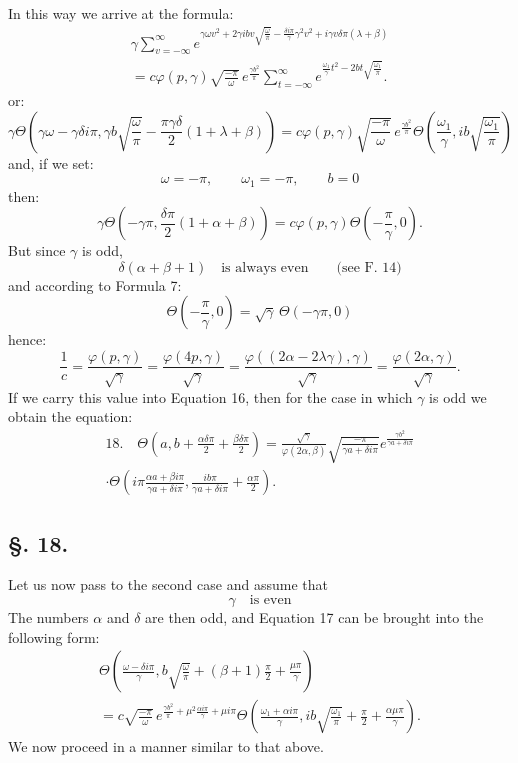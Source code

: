 \documentclass[10pt]{article}
\newcommand{\sourceanchor}[1]{\hypertarget{source-#1}{}}
\begin{document}
In this way we arrive at the formula:
\begin{multline*}
\gamma\sum_{v=-\infty}^{\infty}
 e^{\gamma\omega v^{2}+2\gamma ibv\sqrt{\frac{\omega}{\pi}}-\frac{\delta i\pi}{\gamma}\gamma^{2}v^{2}+i\gamma v\delta\pi(\lambda+\beta)}\\
=c\varphi(p,\gamma)\sqrt{\frac{-\pi}{\omega}}\,e^{\frac{\gamma b^{2}}{\pi}}
\sum_{t=-\infty}^{\infty}e^{\frac{\omega_{1}}{\gamma}t^{2}-2bt\sqrt{\frac{\omega_{1}}{\pi}}}.
\end{multline*}
or:
\begin{equation*}
\gamma\Theta\!\left(\gamma\omega-\gamma\delta i\pi,
 \gamma b\sqrt{\frac{\omega}{\pi}}-\frac{\pi\gamma\delta}{2}(1+\lambda+\beta)\right)
=c\varphi(p,\gamma)\sqrt{\frac{-\pi}{\omega}}\,e^{\frac{\gamma b^{2}}{\pi}}
\Theta\!\left(\frac{\omega_{1}}{\gamma},ib\sqrt{\frac{\omega_{1}}{\pi}}\right)
\end{equation*}
and, if we set:
\[
\omega=-\pi,
\qquad \omega_{1}=-\pi,
\qquad b=0
\]
then:
\[
\gamma\Theta\!\left(-\gamma\pi,\frac{\delta\pi}{2}(1+\alpha+\beta)\right)
=c\varphi(p,\gamma)\Theta\!\left(-\frac{\pi}{\gamma},0\right).
\]
But since \(\gamma\) is odd,
\[
\delta(\alpha+\beta+1)\quad\text{is always even} \qquad\text{(see F. 14)}
\]
and according to Formula 7:
\[
\Theta\!\left(-\frac{\pi}{\gamma},0\right)=\sqrt{\gamma}\,\Theta(-\gamma\pi,0)
\]
hence:
\[
\frac{1}{c}=\frac{\varphi(p,\gamma)}{\sqrt{\gamma}}
=\frac{\varphi(4p,\gamma)}{\sqrt{\gamma}}
=\frac{\varphi((2\alpha-2\lambda\gamma),\gamma)}{\sqrt{\gamma}}
=\frac{\varphi(2\alpha,\gamma)}{\sqrt{\gamma}}.
\]
If we carry this value into Equation 16, then for the case in which \(\gamma\) is odd we obtain the equation:
\begin{multline*}
18.\quad
\Theta\!\left(a,b+\frac{\alpha\delta\pi}{2}+\frac{\beta\delta\pi}{2}\right)
=\frac{\sqrt{\gamma}}{\varphi(2\alpha,\beta)}
\sqrt{\frac{-\pi}{\gamma a+\delta i\pi}}
 e^{\frac{\gamma b^{2}}{\gamma a+\delta i\pi}}\\
\cdot\Theta\!\left(i\pi\frac{\alpha a+\beta i\pi}{\gamma a+\delta i\pi},
\frac{ib\pi}{\gamma a+\delta i\pi}+\frac{\alpha\pi}{2}\right).
\end{multline*}

\subsection*{\S. 18.}
Let us now pass to the second case and assume that
\[
\gamma\quad\text{is even}
\]
\sourceanchor{PA15}
The numbers \(\alpha\) and \(\delta\) are then odd, and Equation 17 can be brought into the following form:
\begin{multline*}
\Theta\!\left(\frac{\omega-\delta i\pi}{\gamma},
 b\sqrt{\frac{\omega}{\pi}}+(\beta+1)\frac{\pi}{2}+\frac{\mu\pi}{\gamma}\right)\\
=c\sqrt{\frac{-\pi}{\omega}}\,e^{\frac{\gamma b^{2}}{\pi}+\mu^{2}\frac{\alpha i\pi}{\gamma}+\mu i\pi}
\Theta\!\left(\frac{\omega_{1}+\alpha i\pi}{\gamma},
 ib\sqrt{\frac{\omega_{1}}{\pi}}+\frac{\pi}{2}+\frac{\alpha\mu\pi}{\gamma}\right).
\end{multline*}
We now proceed in a manner similar to that above.
\end{document}
